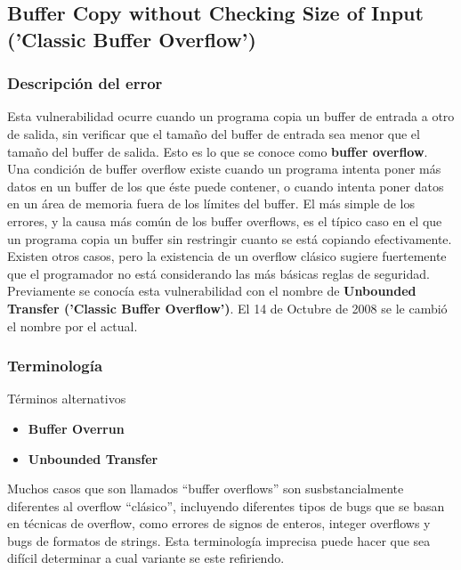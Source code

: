 \subsection{Buffer Copy without Checking Size of Input ('Classic Buffer Overflow')}

\subsubsection{Descripción del error}

Esta vulnerabilidad ocurre cuando un programa copia un buffer de entrada a otro de salida, sin verificar que el tamaño del buffer de entrada sea menor que el tamaño del buffer de salida.
Esto es lo que se conoce como \textbf{buffer overflow}.\\

Una condición de buffer overflow existe cuando un programa intenta poner más datos en un buffer de los que éste puede contener, o cuando intenta poner datos en un área de memoria
fuera de los límites del buffer. El más simple de los errores, y la causa más común de los buffer overflows, es el típico caso en el que un programa copia un buffer sin
restringir cuanto se está copiando efectivamente. Existen otros casos, pero la existencia de un overflow clásico sugiere fuertemente que el programador no está considerando
las más básicas reglas de seguridad. \\

Previamente se conocía esta vulnerabilidad con el nombre de \textbf{Unbounded Transfer ('Classic Buffer Overflow')}. El 14 de Octubre de 2008 se le cambió el nombre por el actual.

\subsubsection{Terminología}
Términos alternativos
\begin{itemize}
    \item \textbf{Buffer Overrun}
    \item \textbf{Unbounded Transfer}
\end{itemize}

Muchos casos que son llamados ``buffer overflows'' son susbstancialmente diferentes al overflow ``clásico'', incluyendo diferentes tipos de bugs que se basan en técnicas
de overflow, como errores de signos de enteros, integer overflows y bugs de formatos de strings. Esta terminología imprecisa puede hacer que sea difícil determinar a cual
variante se este refiriendo.

